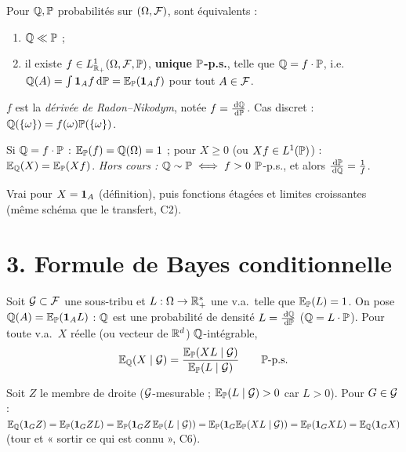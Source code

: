 \documentclass[11pt,a4paper]{article}
\begin{document}
\begin{theoreme}\label{C7:RN}
Pour $\mathbb{Q},\mathbb{P}$ probabilités sur $(\Omega,\mathcal{F})$, sont équivalents :
\begin{enumerate}
  \item $\mathbb{Q}\ll\mathbb{P}$ ;
  \item il existe $f\in L^1_{\mathbb{R}_+}(\Omega,\mathcal{F},\mathbb{P})$, \textbf{unique $\mathbb{P}$-p.s.}, telle que $\mathbb{Q}=f\cdot\mathbb{P}$, i.e.\
  $\mathbb{Q}(A)=\int\mathbf{1}_Af\,\mathrm{d}\mathbb{P}=\mathbb{E}_{\mathbb{P}}(\mathbf{1}_Af)$ pour tout $A\in\mathcal{F}$.
\end{enumerate}
$f$ est la \emph{dérivée de Radon--Nikodym}, notée $f=\frac{\,\mathrm{d}\mathbb{Q}}{\,\mathrm{d}\mathbb{P}}$. Cas discret : $\mathbb{Q}(\{\omega\})=f(\omega)\mathbb{P}(\{\omega\})$.
\end{theoreme}

\begin{corollaire}[standard]\label{C7:EQ}
Si $\mathbb{Q}=f\cdot\mathbb{P}$ : $\mathbb{E}_{\mathbb{P}}(f)=\mathbb{Q}(\Omega)=1$ ; pour $X\ge0$ (ou $Xf\in L^1(\mathbb{P})$) : $\mathbb{E}_{\mathbb{Q}}(X)=\mathbb{E}_{\mathbb{P}}(Xf)$.
\emph{Hors cours :} $\mathbb{Q}\sim\mathbb{P}\iff f>0$ $\mathbb{P}$-p.s., et alors $\frac{\,\mathrm{d}\mathbb{P}}{\,\mathrm{d}\mathbb{Q}}=\frac1f$.
\end{corollaire}
\begin{idee}
Vrai pour $X=\mathbf{1}_A$ (définition), puis fonctions étagées et limites croissantes (même schéma que le transfert, C2).
\end{idee}

\section*{3. Formule de Bayes conditionnelle}

\begin{theoreme}\label{C7:bayes}
Soit $\mathcal{G}\subset\mathcal{F}$ une sous-tribu et $L:\Omega\to\mathbb{R}_+^*$ une v.a.\ telle que $\mathbb{E}_{\mathbb{P}}(L)=1$. On pose $\mathbb{Q}(A)=\mathbb{E}_{\mathbb{P}}(\mathbf{1}_AL)$ :
$\mathbb{Q}$ est une probabilité de densité $L=\frac{\,\mathrm{d}\mathbb{Q}}{\,\mathrm{d}\mathbb{P}}$ ($\mathbb{Q}=L\cdot\mathbb{P}$). Pour toute v.a.\ $X$ réelle (ou vecteur de $\mathbb{R}^d$)
$\mathbb{Q}$-intégrable,
\[\mathbb{E}_{\mathbb{Q}}(X\mid\mathcal{G})=\frac{\mathbb{E}_{\mathbb{P}}(XL\mid\mathcal{G})}{\mathbb{E}_{\mathbb{P}}(L\mid\mathcal{G})}\qquad\mathbb{P}\text{-p.s.}\]
\end{theoreme}
\begin{idee}
Soit $Z$ le membre de droite ($\mathcal{G}$-mesurable ; $\mathbb{E}_{\mathbb{P}}(L\mid\mathcal{G})>0$ car $L>0$). Pour $G\in\mathcal{G}$ :
$\mathbb{E}_{\mathbb{Q}}(\mathbf{1}_GZ)=\mathbb{E}_{\mathbb{P}}(\mathbf{1}_GZL)=\mathbb{E}_{\mathbb{P}}(\mathbf{1}_GZ\,\mathbb{E}_{\mathbb{P}}(L\mid\mathcal{G}))=\mathbb{E}_{\mathbb{P}}(\mathbf{1}_G\mathbb{E}_{\mathbb{P}}(XL\mid\mathcal{G}))=\mathbb{E}_{\mathbb{P}}(\mathbf{1}_GXL)=\mathbb{E}_{\mathbb{Q}}(\mathbf{1}_GX)$
(tour et « sortir ce qui est connu », C6).
\end{idee}
\end{document}
